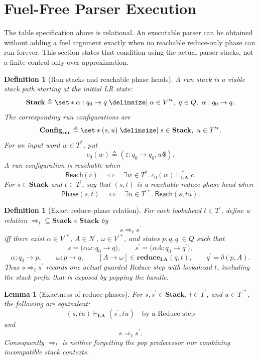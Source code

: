 \documentclass[11pt,a4paper]{article}
\theoremstyle{prettyplain}
\newtheorem{lemma}[theorem]{Lemma}
\theoremstyle{prettydef}
\newtheorem{definition}[theorem]{Definition}
\def\mid{\;\delimsize\vert\;}#1%
\newcommand{\eps}{\varepsilon}
\newcommand{\Path}[3]{#1:#2\to#3}
\newcommand{\Item}[2]{[#1\to #2]}
\newcommand{\Look}{\mathbf{LA}}
\newcommand{\Config}{\mathbf{Config}}
\newcommand{\Reduce}{\mathbf{reduce}}
\begin{document}
\section{Fuel-Free Parser Execution}\label{sec:fuel-free-parser}

The table specification above is relational.  An executable parser can be
obtained without adding a fuel argument exactly when no reachable reduce-only
phase can run forever.  This section states that condition using the actual
parser stacks, not a finite control-only over-approximation.

\begin{definition}[Run stacks and reachable phase heads]\label{def:run-stacks-phase}
A run stack is a viable stack path starting at the initial LR state:
\[
\mathbf{Stack}
\triangleq
\set*{\Path{\alpha}{q_0}{q}
\mid
\alpha\in V^{\prime *},\ q\in Q,\ \Path{\alpha}{q_0}{q}}.
\]
The corresponding run configurations are
\[
\Config_{\mathrm{run}}
\triangleq
\set*{(s,u)
\mid
s\in\mathbf{Stack},\ u\in T^{\prime *}}.
\]
For an input word \(w\in T^*\), put
\[
c_0(w)
\triangleq
(\Path{\eps}{q_0}{q_0},w\$).
\]
A run configuration is reachable when
\[
\mathsf{Reach}(c)
\quad\Longleftrightarrow\quad
\exists w\in T^*.\ c_0(w)\vdash_{\Look}^{\,*}c.
\]
For \(s\in\mathbf{Stack}\) and \(t\in T^\prime\), say that \((s,t)\) is a
reachable reduce-phase head when
\[
\mathsf{Phase}(s,t)
\quad\Longleftrightarrow\quad
\exists u\in T^{\prime *}.\ \mathsf{Reach}(s,t u).
\]
\end{definition}

\begin{definition}[Exact reduce-phase relation]\label{def:exact-reduce-phase}
For each lookahead \(t\in T^\prime\), define a relation
\(\Rightarrow_t\subseteq\mathbf{Stack}\times\mathbf{Stack}\) by
\[
s\Rightarrow_t s^\prime
\]
iff there exist \(\alpha\in V^{\prime *}\), \(A\in N^\prime\),
\(\omega\in V^{\prime *}\), and states \(p,q,q^\prime\in Q\) such that
\[
s=\bigl(\Path{\alpha\omega}{q_0}{q}\bigr),
\qquad
s^\prime=\bigl(\Path{\alpha A}{q_0}{q^\prime}\bigr),
\]
\[
\Path{\alpha}{q_0}{p},
\qquad
\Path{\omega}{p}{q},
\qquad
\Item{A}{\omega}\in\Reduce_{\Look}(q,t),
\qquad
q^\prime=\delta(p,A).
\]
Thus \(s\Rightarrow_t s^\prime\) records one actual guarded Reduce step with
lookahead \(t\), including the stack prefix that is exposed by popping the
handle.
\end{definition}

\begin{lemma}[Exactness of reduce phases]\label{lem:exact-reduce-phase}
For \(s,s^\prime\in\mathbf{Stack}\), \(t\in T^\prime\), and
\(u\in T^{\prime *}\), the following are equivalent:
\[
(s,t u)\vdash_{\Look}(s^\prime,t u)
\quad\text{by a Reduce step}
\]
and
\[
s\Rightarrow_t s^\prime.
\]
Consequently \(\Rightarrow_t\) is neither forgetting the pop predecessor nor
combining incompatible stack contexts.
\end{lemma}
\end{document}
